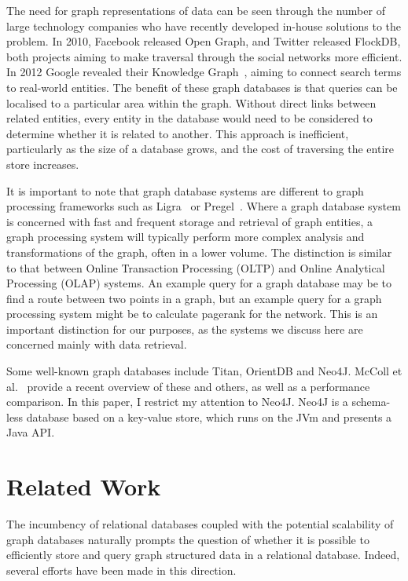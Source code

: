 The need for graph representations of data can be seen through the number of
large technology companies who have recently developed in-house solutions to
the problem. In 2010, Facebook released Open Graph, and Twitter released
FlockDB\cite{pointer2010introducing}, both projects aiming to make traversal
through the social networks more efficient. In 2012 Google revealed their
Knowledge Graph~\cite{singhal2012introducing}, aiming to connect search terms
to real-world entities. The benefit of these graph databases is that queries
can be localised to a particular area within the graph. Without direct links
between related entities, every entity in the database would need to be
considered to determine whether it is related to another. This approach is
inefficient, particularly as the size of a database grows, and the cost of
traversing the  entire store increases.

It is important to note that graph database systems are different to graph
processing frameworks such as Ligra~\cite{shun2013ligra} or
Pregel~\cite{malewicz2010pregel}. Where a graph database system is concerned
with fast and frequent storage and retrieval of graph entities, a graph
processing system will typically perform more complex analysis and
transformations of the graph, often in a lower volume. The distinction is
similar to that between Online Transaction Processing (OLTP) and Online
Analytical Processing (OLAP) systems. An example query for a graph database
may be to find a route between two points in a graph, but an example query for
a graph processing system might be to calculate pagerank for the network. This
is an important distinction for our purposes, as the systems we discuss here
are concerned mainly with data retrieval. 

Some well-known graph databases include Titan, OrientDB and Neo4J. McColl et
al.~\cite{mccoll2014performance} provide a recent overview of these and
others, as well as a performance comparison. In this paper, I restrict my
attention to Neo4J. Neo4J is a schema-less database based on a key-value
store, which runs on the JVm and presents a Java API.

\section{Related Work}

The incumbency of relational databases coupled with the potential scalability
of  graph databases naturally prompts the question of whether it is possible
to efficiently store and query graph structured data in a relational database.
Indeed, several efforts have been made in this direction. 

